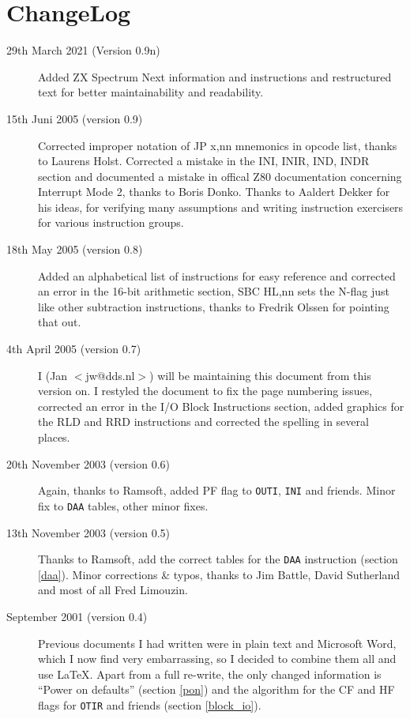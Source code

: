 \documentclass[oneside,a4paper]{book}
\begin{document}
\section{ChangeLog}
\begin{description}

\item[29th March 2021 (Version 0.9n)]
Added ZX Spectrum Next information and instructions and restructured text for better maintainability and readability.

\item[15th Juni 2005 (version 0.9)] 
Corrected improper notation of JP x,nn mnemonics in opcode list, thanks to
Laurens Holst. Corrected a mistake in the INI, INIR, IND, INDR section 
and documented a mistake in offical Z80 documentation concerning Interrupt 
Mode 2, thanks to Boris Donko. Thanks to Aaldert Dekker for his ideas, for 
verifying many assumptions and writing instruction exercisers for various 
instruction groups.

\item[18th May 2005 (version 0.8)] 
Added an alphabetical list of instructions for easy reference and corrected an 
error in the 16-bit arithmetic section, SBC HL,nn sets the N-flag just like
other subtraction instructions, thanks to Fredrik Olssen for pointing that out.

\item[4th April 2005 (version 0.7)] 
I (Jan $<$jw@dds.nl$>$) will be maintaining this document from this version on.
I restyled the document to fix the page numbering issues, 
corrected an error in the I/O Block Instructions section, added 
graphics for the RLD and RRD instructions and corrected the spelling in several places.

\item[20th November 2003 (version 0.6)] 
Again, thanks to Ramsoft, added PF flag to {\tt OUTI}, {\tt INI} and
friends. Minor fix to {\tt DAA} tables, other minor fixes.

\item[13th November 2003 (version 0.5)]
Thanks to Ramsoft, add the correct tables for the {\tt DAA} instruction
(section \ref{daa}). Minor corrections \& typos, thanks to Jim Battle,
David Sutherland and most of all Fred Limouzin.

\item[September 2001 (version 0.4)]
Previous documents I had written were in plain text and Microsoft
Word, which I now find very embarrassing, so I decided to combine them all 
and use {\LaTeX}. Apart from a full re-write, the only changed information is
``Power on defaults'' (section \ref{pon}) and the algorithm for the CF 
and HF flags for {\tt OTIR} and friends (section \ref{block_io}).

\end{description}
\end{document}

